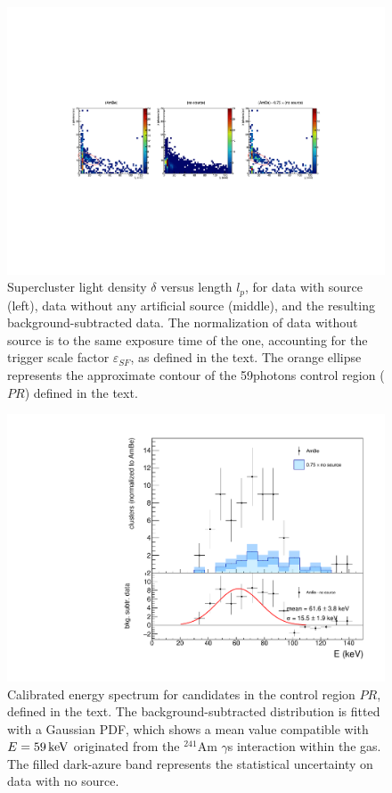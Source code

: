 \begin{figure}[ht]
  \begin{center}
  \includegraphics[width=0.90\linewidth]{figures/densityvslength_zoom}

  \caption{Supercluster light density $\delta$ versus length $l_p$,
    for data with \ambe source (left), data without any artificial
    source (middle), and the resulting background-subtracted \ambe
    data.  The normalization of data without source is to the same
    exposure time of the \ambe one, accounting for the trigger scale
    factor $\varepsilon_{SF}$, as defined in the text. The orange
    ellipse represents the approximate contour of the 59\keV photons
    control region ($PR$) defined in the text. \label{fig:dvsl}}

  \end{center}
\end{figure}

\begin{figure}[ht]
  \begin{center}
  \includegraphics[width=0.60\linewidth]{figures/calintegral_59keV}

  \caption{Calibrated energy spectrum for candidates in the control
    region $PR$, defined in the text. The background-subtracted
    distribution is fitted with a Gaussian PDF, which shows a mean
    value compatible with $E=59\,\textrm{ke\hspace{-.08em}V}$ originated from the $^{241}$Am
    $\gamma$s interaction within the gas. The filled dark-azure band
    represents the statistical uncertainty on data with no
    source. \label{fig:59keV}}

  \end{center}
\end{figure}

